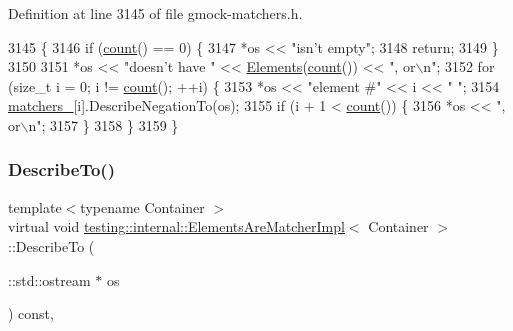Definition at line 3145 of file gmock-\/matchers.\+h.


\begin{DoxyCode}
3145                                                         \{
3146     \textcolor{keywordflow}{if} (\hyperlink{classtesting_1_1internal_1_1ElementsAreMatcherImpl_a8a8cf605a9fdc0eb8855fe9ce1aafb1e}{count}() == 0) \{
3147       *os << \textcolor{stringliteral}{"isn't empty"};
3148       \textcolor{keywordflow}{return};
3149     \}
3150 
3151     *os << \textcolor{stringliteral}{"doesn't have "} << \hyperlink{classtesting_1_1internal_1_1ElementsAreMatcherImpl_a93f460d160390f2984c040e1869d3b0d}{Elements}(\hyperlink{classtesting_1_1internal_1_1ElementsAreMatcherImpl_a8a8cf605a9fdc0eb8855fe9ce1aafb1e}{count}()) << \textcolor{stringliteral}{", or\(\backslash\)n"};
3152     \textcolor{keywordflow}{for} (\textcolor{keywordtype}{size\_t} i = 0; i != \hyperlink{classtesting_1_1internal_1_1ElementsAreMatcherImpl_a8a8cf605a9fdc0eb8855fe9ce1aafb1e}{count}(); ++i) \{
3153       *os << \textcolor{stringliteral}{"element #"} << i << \textcolor{stringliteral}{" "};
3154       \hyperlink{classtesting_1_1internal_1_1ElementsAreMatcherImpl_aefcf41a7cfe74274c68272a67fb94e9f}{matchers\_}[i].DescribeNegationTo(os);
3155       \textcolor{keywordflow}{if} (i + 1 < \hyperlink{classtesting_1_1internal_1_1ElementsAreMatcherImpl_a8a8cf605a9fdc0eb8855fe9ce1aafb1e}{count}()) \{
3156         *os << \textcolor{stringliteral}{", or\(\backslash\)n"};
3157       \}
3158     \}
3159   \}
\end{DoxyCode}
\mbox{\label{classtesting_1_1internal_1_1ElementsAreMatcherImpl_a685f19f64b22a37317332d512c1bce52}} 
\subsubsection{\texorpdfstring{Describe\+To()}{DescribeTo()}}
{\footnotesize\ttfamily template$<$typename Container $>$ \\
virtual void \hyperlink{classtesting_1_1internal_1_1ElementsAreMatcherImpl}{testing\+::internal\+::\+Elements\+Are\+Matcher\+Impl}$<$ Container $>$\+::Describe\+To (\begin{DoxyParamCaption}\item[{\+::std\+::ostream $\ast$}]{os }\end{DoxyParamCaption}) const\hspace{0.3cm}{\ttfamily [inline]}, {\ttfamily [virtual]}}




